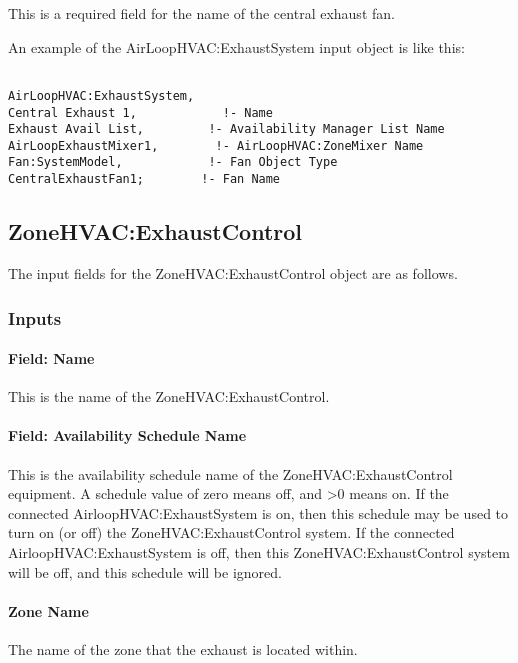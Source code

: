 This is a required field for the name of the central exhaust fan.

An example of the AirLoopHVAC:ExhaustSystem input object is like this:

\begin{lstlisting}

AirLoopHVAC:ExhaustSystem,
Central Exhaust 1,            !- Name
Exhaust Avail List,         !- Availability Manager List Name
AirLoopExhaustMixer1,        !- AirLoopHVAC:ZoneMixer Name    
Fan:SystemModel,            !- Fan Object Type
CentralExhaustFan1;        !- Fan Name

\end{lstlisting}

\subsection{ZoneHVAC:ExhaustControl}

The input fields for the ZoneHVAC:ExhaustControl object are as follows.

\subsubsection{Inputs}

\paragraph{Field: Name}

This is the name of the ZoneHVAC:ExhaustControl.

\paragraph{Field: Availability Schedule Name}

This is the availability schedule name of the ZoneHVAC:ExhaustControl equipment. A schedule value of zero means off, and >0 means on. If the connected AirloopHVAC:ExhaustSystem is on, then this schedule may be used to turn on (or off) the ZoneHVAC:ExhaustControl system. If the connected AirloopHVAC:ExhaustSystem is off, then this ZoneHVAC:ExhaustControl system will be off, and this schedule will be ignored.

\paragraph{Zone Name}

The name of the zone that the exhaust is located within.

